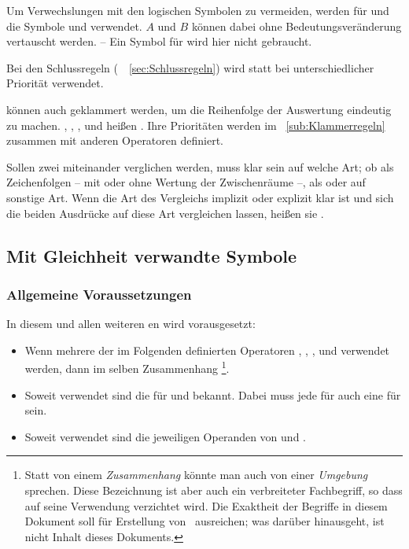 Um Verwechslungen mit den logischen Symbolen zu vermeiden, werden für  und  die Symbole \symqt{$\metaund$} und \symqt{$\metaoder$} verwendet.
$A$ und $B$ können dabei ohne Bedeutungsveränderung vertauscht werden.
-- Ein Symbol für  wird hier nicht gebraucht.

Bei den Schlussregeln (\seename\ \sectionname~\vref{sec:Schlussregeln}) wird \symqt{$\mid$} statt \symqt{$\metaund$} bei unterschiedlicher Priorität verwendet.

 können auch geklammert werden, um die Reihenfolge der Auswertung eindeutig zu machen.
\symqt{$\metaimp$}, \symqt{$\metarep$}, \symqt{$\metaequiv$}, \symqt{$\metaund$} und \symqt{$\metaoder$} heißen \emph{}.
Ihre Prioritäten werden im \subsectionname~\vref{sub:Klammerregeln} zusammen mit anderen Operatoren definiert.

Sollen zwei  miteinander verglichen werden, muss klar sein auf welche Art; ob \textzB als Zeichenfolgen -- mit oder ohne Wertung der Zwischenräume --, als  oder auf sonstige Art.
Wenn die Art des Vergleichs implizit oder explizit klar ist und sich die beiden Ausdrücke auf diese Art vergleichen lassen, heißen sie \emph{}.

\subsection{Mit Gleichheit verwandte Symbole}%
\label{sub:Gleichheit}

\subsubsection{Allgemeine Voraussetzungen}
\label{subsub:Voraussetzungen}

In diesem und allen weiteren \sectionname{}en wird vorausgesetzt:
\begin{itemize}

	\item Wenn mehrere der im Folgenden definierten Operatoren \symqt{$\metadefeq$}, , \symqt{$=$}, \symqt{$\ne$} und \symqt{$\equiv$} verwendet werden, dann im selben Zusammenhang%
	\footnote{%
		Statt von einem \emph{Zusammenhang} könnte man auch von einer \emph{Umgebung} sprechen.
		Diese Bezeichnung ist aber auch ein verbreiteter Fachbegriff, so dass auf seine Verwendung verzichtet wird.
		Die Exaktheit der Begriffe in diesem Dokument soll für Erstellung von \ASBA\ ausreichen; was darüber hinausgeht, ist nicht Inhalt dieses Dokuments.%
	}.

	\item Soweit verwendet sind die \emph{} für \symqt{$=$} und \symqt{$\equiv$} bekannt.
	Dabei muss jede  für \symqt{$\equiv$} auch eine für \symqt{$=$} sein.

	\item Soweit verwendet sind die jeweiligen Operanden von \symqt{$=$} und \symqt{$\equiv$} .

\end{itemize}

